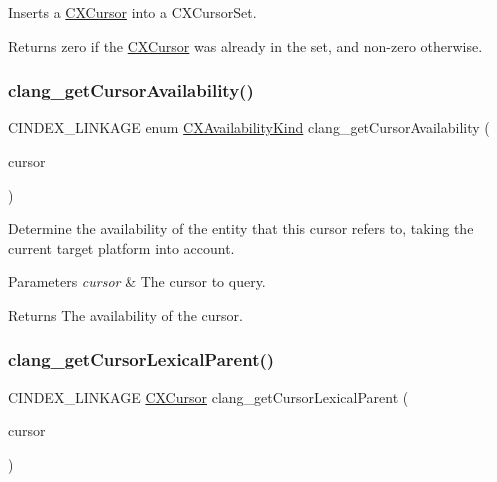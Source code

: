 Inserts a \hyperlink{structCXCursor}{C\+X\+Cursor} into a C\+X\+Cursor\+Set. 

\begin{DoxyReturn}{Returns}
zero if the \hyperlink{structCXCursor}{C\+X\+Cursor} was already in the set, and non-\/zero otherwise. 
\end{DoxyReturn}
\mbox{\label{group__CINDEX__CURSOR__MANIP_gab44e2a565fa40a0e0fc0f130f618a9b5}} 
\subsubsection{\texorpdfstring{clang\+\_\+get\+Cursor\+Availability()}{clang\_getCursorAvailability()}}
{\footnotesize\ttfamily C\+I\+N\+D\+E\+X\+\_\+\+L\+I\+N\+K\+A\+GE enum \hyperlink{group__CINDEX_gada331ea0195e952c8f181ecf15e83d71}{C\+X\+Availability\+Kind} clang\+\_\+get\+Cursor\+Availability (\begin{DoxyParamCaption}\item[{\hyperlink{structCXCursor}{C\+X\+Cursor}}]{cursor }\end{DoxyParamCaption})}



Determine the availability of the entity that this cursor refers to, taking the current target platform into account. 


\begin{DoxyParams}{Parameters}
{\em cursor} & The cursor to query.\\
\hline
\end{DoxyParams}
\begin{DoxyReturn}{Returns}
The availability of the cursor. 
\end{DoxyReturn}
\mbox{\label{group__CINDEX__CURSOR__MANIP_gace7a423874d72b3fdc71d6b0f31830dd}} 
\subsubsection{\texorpdfstring{clang\+\_\+get\+Cursor\+Lexical\+Parent()}{clang\_getCursorLexicalParent()}}
{\footnotesize\ttfamily C\+I\+N\+D\+E\+X\+\_\+\+L\+I\+N\+K\+A\+GE \hyperlink{structCXCursor}{C\+X\+Cursor} clang\+\_\+get\+Cursor\+Lexical\+Parent (\begin{DoxyParamCaption}\item[{\hyperlink{structCXCursor}{C\+X\+Cursor}}]{cursor }\end{DoxyParamCaption})}



